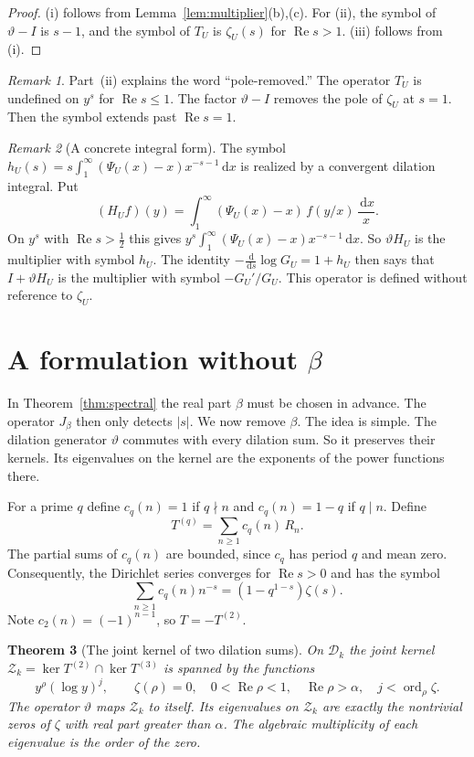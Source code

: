 \documentclass[12pt,letterpaper]{article}
\newtheorem{theorem}{Theorem}[section]
\theoremstyle{definition}
\theoremstyle{remark}
\newtheorem{remark}[theorem]{Remark}
\numberwithin{equation}{section}
\newcommand{\Ree}{\operatorname{Re}}
\newcommand{\dd}{\,\mathrm{d}}
\newcommand{\Dk}{\mathcal{D}_k}
\newcommand{\kerop}{\operatorname{ker}}
\newcommand{\ord}{\operatorname{ord}}
\newcommand{\yD}{\vartheta}
\begin{document}
\begin{proof}
(i) follows from Lemma~\ref{lem:multiplier}(b),(c). For (ii), the symbol
of $\yD-I$ is $s-1$, and the symbol of $T_U$ is $\zeta_U(s)$ for
$\Ree s>1$. (iii) follows from (i).
\end{proof}

\begin{remark}
Part~(ii) explains the word ``pole-removed.'' The operator $T_U$ is
undefined on $y^s$ for $\Ree s\le1$. The factor $\yD-I$ removes the pole of
$\zeta_U$ at $s=1$. Then the symbol extends past $\Ree s=1$.
\end{remark}

\begin{remark}[A concrete integral form]
The symbol $h_U(s)=s\int_1^\infty(\Psi_U(x)-x)x^{-s-1}\dd x$ is realized by
a convergent dilation integral. Put
\[
(H_Uf)(y)=\int_1^\infty(\Psi_U(x)-x)\,f(y/x)\,\frac{\dd x}{x}.
\]
On $y^s$ with $\Ree s>\frac12$ this gives
$y^s\int_1^\infty(\Psi_U(x)-x)x^{-s-1}\dd x$. So $\yD H_U$ is the
multiplier with symbol $h_U$. The identity
$-\frac{\dd}{\dd s}\log G_U=1+h_U$ then says that $I+\yD H_U$ is the
multiplier with symbol $-G_U'/G_U$. This operator is defined without
reference to $\zeta_U$.
\end{remark}

\section{A formulation without \texorpdfstring{$\beta$}{beta}}\label{sec:betafree}

In Theorem~\ref{thm:spectral} the real part $\beta$ must be chosen in
advance. The operator $J_\beta$ then only detects $|s|$. We now remove
$\beta$. The idea is simple. The dilation generator $\yD$ commutes with
every dilation sum. So it preserves their kernels. Its eigenvalues on the
kernel are the exponents of the power functions there.

For a prime $q$ define $c_q(n)=1$ if $q\nmid n$ and $c_q(n)=1-q$ if
$q\mid n$. Define
\[
T^{(q)}=\sum_{n\ge1}c_q(n)\,R_n.
\]
The partial sums of $c_q(n)$ are bounded, since $c_q$ has period $q$ and
mean zero. Consequently, the Dirichlet series converges for $\Ree s>0$ and
has the symbol
\begin{equation}\label{eq:residue-symbol}
  \sum_{n\ge1}c_q(n)n^{-s}=(1-q^{1-s})\zeta(s).
\end{equation}
Note $c_2(n)=(-1)^{n-1}$, so
$T=-T^{(2)}$.

\begin{theorem}[The joint kernel of two dilation sums]\label{thm:betafree}
On $\Dk$ the joint kernel $\mathcal Z_k=\kerop T^{(2)}\cap\kerop T^{(3)}$
is spanned by the functions
\[
y^\rho(\log y)^j,\qquad \zeta(\rho)=0,\quad 0<\Ree\rho<1,\quad
\Ree\rho>\alpha,\quad j<\ord_\rho\zeta.
\]
The operator $\yD$ maps $\mathcal Z_k$ to itself. Its eigenvalues on
$\mathcal Z_k$ are exactly the nontrivial zeros of $\zeta$ with real part
greater than $\alpha$. The algebraic multiplicity of each eigenvalue is
the order of the zero.
\end{theorem}
\end{document}

